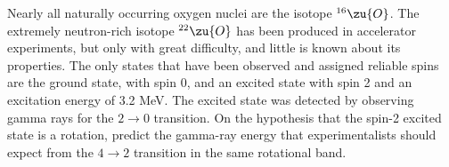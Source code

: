 Nearly all naturally occurring oxygen nuclei are the isotope ${}^{16}\zu{O}$.
The extremely neutron-rich isotope ${}^{22}\zu{O}$ has been produced in accelerator
experiments, but only with great difficulty, and little is known about its properties.
The only states that have been observed and assigned reliable spins are the ground state,
with spin 0, and an excited state with spin 2 and an excitation energy of 3.2 MeV.
The excited state was detected by observing gamma rays for the $2\rightarrow0$ transition.
On the hypothesis that the spin-2 excited state is a rotation, predict the gamma-ray
energy that experimentalists should expect from the $4\rightarrow2$ transition
in the same rotational band.
